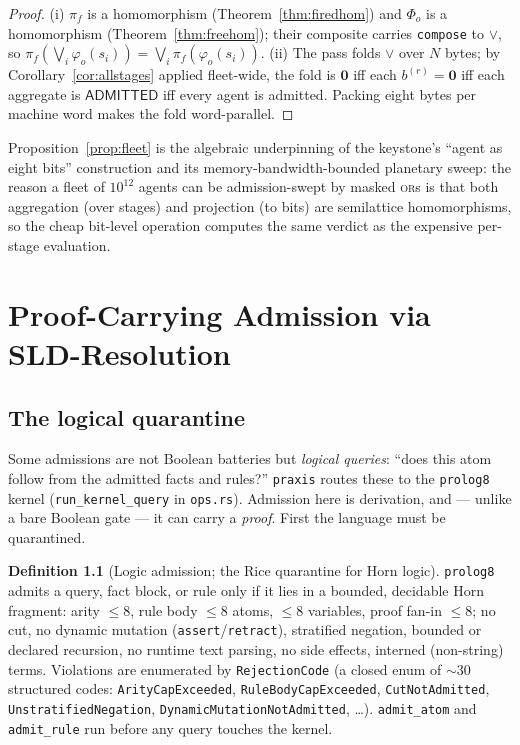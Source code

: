 \documentclass[11pt,oneside]{book}
\theoremstyle{definition}
\newtheorem{definition}{Definition}[chapter]
\theoremstyle{plain}
\theoremstyle{remark}
\newcommand{\code}[1]{\texttt{#1}}
\newcommand{\Adml}{\mathsf{ADMITTED}}          %
\newcommand{\firedmap}{\pi_{f}}                %
\begin{document}
\begin{proof}
(i) $\firedmap$ is a homomorphism (Theorem~\ref{thm:firedhom}) and $\Phi_o$ is a homomorphism
(Theorem~\ref{thm:freehom}); their composite carries \code{compose} to $\lor$, so
$\firedmap(\bigvee_i\varphi_o(s_i))=\bigvee_i\firedmap(\varphi_o(s_i))$. (ii) The pass folds
$\lor$ over $N$ bytes; by Corollary~\ref{cor:allstages} applied fleet-wide, the fold is $\bm 0$
iff each $b^{(r)}=\bm 0$ iff each aggregate is $\Adml$ iff every agent is admitted. Packing eight
bytes per machine word makes the fold word-parallel. \end{proof}

Proposition~\ref{prop:fleet} is the algebraic underpinning of the keystone's ``agent as eight
bits'' construction and its memory-bandwidth-bounded planetary sweep: the reason a fleet of
$10^{12}$ agents can be admission-swept by masked \textsc{or}s is that both aggregation
(over stages) and projection (to bits) are semilattice homomorphisms, so the cheap bit-level
operation computes the same verdict as the expensive per-stage evaluation.

\chapter{Proof-Carrying Admission via SLD-Resolution}
\label{ch:proof}

\section{The logical quarantine}

Some admissions are not Boolean batteries but \emph{logical queries}: ``does this atom follow
from the admitted facts and rules?'' \code{praxis} routes these to the \code{prolog8} kernel
(\code{run\_kernel\_query} in \code{ops.rs}). Admission here is derivation, and --- unlike a
bare Boolean gate --- it can carry a \emph{proof}. First the language must be quarantined.

\begin{definition}[Logic admission; the Rice quarantine for Horn logic]\label{def:logicadm}
\code{prolog8} admits a query, fact block, or rule only if it lies in a bounded, decidable
Horn fragment: arity $\le 8$, rule body $\le 8$ atoms, $\le 8$ variables, proof fan-in $\le 8$;
no cut, no dynamic mutation (\code{assert}/\code{retract}), stratified negation, bounded or
declared recursion, no runtime text parsing, no side effects, interned (non-string) terms.
Violations are enumerated by \code{RejectionCode} (a closed enum of $\sim\!30$ structured
codes: \code{ArityCapExceeded}, \code{RuleBodyCapExceeded}, \code{CutNotAdmitted},
\code{UnstratifiedNegation}, \code{DynamicMutationNotAdmitted}, \dots). \code{admit\_atom} and
\code{admit\_rule} run before any query touches the kernel.
\end{definition}
\end{document}
